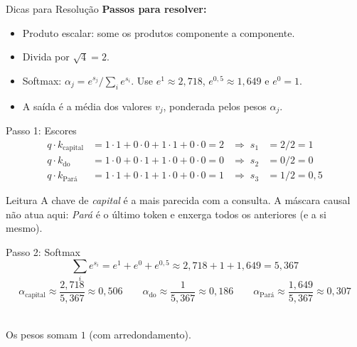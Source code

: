 \documentclass[aspectratio=169]{beamer}
\begin{document}
\begin{frame}{Dicas para Resolução}
    \textbf{Passos para resolver:}
    \begin{itemize}
        \item Produto escalar: some os produtos componente a componente.
        \item Divida por $\sqrt{4} = 2$.
        \item Softmax: $\alpha_j = e^{s_j} / \sum_i e^{s_i}$. Use $e^{1} \approx 2{,}718$, $e^{0{,}5} \approx 1{,}649$ e $e^{0} = 1$.
        \item A saída é a média dos valores $v_j$, ponderada pelos pesos $\alpha_j$.
    \end{itemize}
\end{frame}

\begin{frame}{Passo 1: Escores}
    \footnotesize
    \begin{align*}
      q \cdot k_{\text{capital}} &= 1{\cdot}1 + 0{\cdot}0 + 1{\cdot}1 + 0{\cdot}0 = 2 &\Rightarrow\; s_1 &= 2/2 = 1\\
      q \cdot k_{\text{do}}      &= 1{\cdot}0 + 0{\cdot}1 + 1{\cdot}0 + 0{\cdot}0 = 0 &\Rightarrow\; s_2 &= 0/2 = 0\\
      q \cdot k_{\text{Pará}}    &= 1{\cdot}1 + 0{\cdot}1 + 1{\cdot}0 + 0{\cdot}0 = 1 &\Rightarrow\; s_3 &= 1/2 = 0{,}5
    \end{align*}
    \pause
    \begin{block}{Leitura}
        \footnotesize A chave de \textit{capital} é a mais parecida com a consulta. A máscara causal não atua aqui: \textit{Pará} é o último token e enxerga todos os anteriores (e a si mesmo).
    \end{block}
\end{frame}

\begin{frame}{Passo 2: Softmax}
    \footnotesize
    \[
      \sum_i e^{s_i} = e^{1} + e^{0} + e^{0,5} \approx 2{,}718 + 1 + 1{,}649 = 5{,}367
    \]
    \[
      \alpha_{\text{capital}} \approx \frac{2{,}718}{5{,}367} \approx 0{,}506
      \qquad
      \alpha_{\text{do}} \approx \frac{1}{5{,}367} \approx 0{,}186
      \qquad
      \alpha_{\text{Pará}} \approx \frac{1{,}649}{5{,}367} \approx 0{,}307
    \]
    \pause
    \centering
    \\[2pt]
    \footnotesize Os pesos somam $1$ (com arredondamento).
\end{frame}
\end{document}
